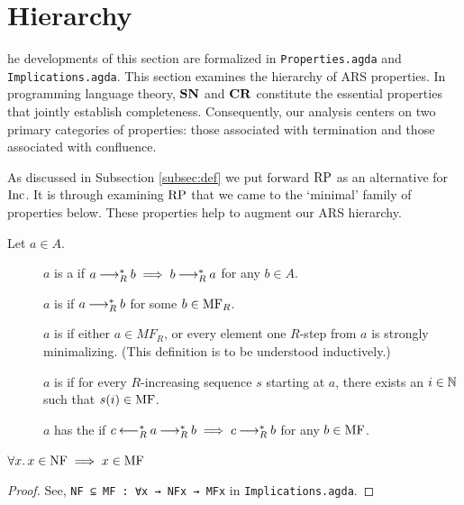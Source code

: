 \section{Hierarchy}
\label{sec:Hierarchy}

\newenvironment{counterexample}[1][]{%
    \refstepcounter{CEcounter} %
    \noindent \scriptsize\textbf{{\theCEcounter } }  #1\par
}

The developments of this section are formalized in
\texttt{Properties.agda} and
\texttt{Implications.agda}. This section examines the hierarchy of ARS properties.
In programming language theory, $\mathbf{SN}$ and $\mathbf{CR}$ constitute the essential properties that
jointly establish completeness.
Consequently, our analysis centers on two primary categories of properties: those associated
with termination and those associated with confluence.

As discussed in Subsection \ref{subsec:def} we put forward $\mathrm{RP}$ as an alternative for $\mathrm{Inc}$. It is through examining $\mathrm{RP}$ that
we came to the `minimal' family of properties below. These properties help to augment our ARS hierarchy.

\begin{definition}\label{def:mf} Let $a \in A$. \hfill
    \begin{description}
        \item[\bq {}] $a$ is a  if $a \mathbin{\longrightarrow_R^*} b \implies b \mathbin{\longrightarrow_R^*} a$ for any $b \in A$.
        \item[\bq {}] $a$ is  if $a \mathbin{\longrightarrow_R^*} b$ for some $b \in \mathrm{MF}_R$.
        \item[\bq {}]  $a$ is  if either $a \in MF_R$, or every element one $R$-step from $a$ is strongly minimalizing. (This
        definition is to be understood inductively.)
        \item[\bq {}] $a$ is  if for every $R$-increasing sequence $s$ starting at $a$, there exists
        an $i \in \mathbb{N}$ such that $s (i) \in \mathrm{MF}$.
        \item[\bq {}] $a$ has the  if $c \mathbin{\longleftarrow_R^*} a \mathbin{\longrightarrow_R^*} b \implies c \mathbin{\longrightarrow_R^*} b$ for any $b \in \mathrm{MF}$.
    \end{description}
\end{definition}

\begin{proposition}\label{prop:nftomf}
    $\forall x.\, x\in \mathrm{NF} \implies x \in \mathrm{MF}$
\end{proposition}
\begin{proof}
    See, \verb|NF ⊆ MF : ∀x → NFx → MFx| in \texttt{Implications.agda}.
\end{proof}

